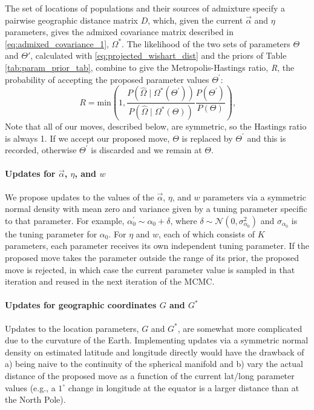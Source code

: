 \documentclass[10pt,letterpaper]{article}
\newcommand{\identifyadmixsource}[1]{{#1^{*}}}
\begin{document}
The set of locations of populations and their sources of admixture specify a pairwise geographic distance matrix $D$, 
which, given the current $\vec{\alpha}$ and $\eta$ parameters, 
gives the admixed covariance matrix described in \eqref{eq:admixed_covariance_1}, $\identifyadmixsource{\Omega}$.  
The likelihood of the two sets of parameters $\Theta$ and $\Theta'$, 
calculated with \eqref{eq:projected_wishart_dist} and the priors of Table \ref{tab:param_prior_tab},
combine to give the Metropolis-Hastings ratio, \emph{R}, the probability of accepting the proposed parameter values $\Theta^{\prime}$:
\begin{equation}
R = \text{min}\left(1, \frac{P(\widehat{\Omega} \mid \identifyadmixsource{\Omega}(\Theta^{\prime}))} {P(\widehat{\Omega} \mid \identifyadmixsource{\Omega}(\Theta))} 
				\frac{P(\Theta^{\prime})}{P(\Theta)} 	\right) \text{,}
\label{eq:MH_algorithm}
\end{equation}
Note that all of our moves, described below, are symmetric, so the Hastings ratio is always 1.
If we accept our proposed move, $\Theta$ is replaced by $\Theta^{\prime}$ and this is recorded, otherwise $\Theta^{\prime}$ is discarded and we remain at $\Theta$. 

\paragraph{Updates for $\vec{\alpha}$, $\eta$, and $w$}
We propose updates to the values of the $\vec{\alpha}$, $\eta$, and $w$ parameters via a symmetric normal density with mean zero 
and variance given by a tuning parameter specific to that parameter.  
For example, $\alpha_0^{\prime} \sim \alpha_0 + \delta$, 
where $\delta \sim \mathcal{N}(0,\sigma_{\alpha_0}^2)$ and $\sigma_{\alpha_0}$ is the tuning parameter for $\alpha_0$.  
For $\eta$ and $w$, each of which consists of $K$ parameters, each parameter receives its own independent tuning parameter. 
If the proposed move takes the parameter outside the range of its prior, the proposed move is rejected, in which case the current parameter value is sampled in that iteration and reused in the next iteration of the MCMC.

\paragraph{Updates for geographic coordinates $G$ and $\identifyadmixsource{G}$} Updates to the location parameters, $G$ and $\identifyadmixsource{G}$, are somewhat more complicated due to the curvature of the Earth.  Implementing updates via a symmetric normal density on estimated latitude and longitude directly would have the drawback of a) being naive to the continuity of the spherical manifold and b) vary the actual distance of the proposed move as a function of the current lat/long parameter values (e.g., a $1^{\circ}$ change in longitude at the equator is a larger distance than at the North Pole).  
\end{document}
